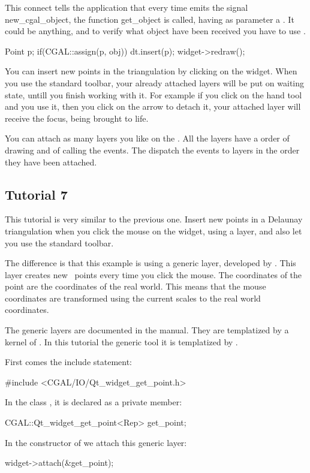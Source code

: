 This connect tells the application that every time
 emits the signal new\_cgal\_object, the function
get\_object is called, having as parameter a . It could be
anything, and to verify what object have been received you have to use
.
\begin{ccExampleCode}
  Point p;
  if(CGAL::assign(p, obj)) {
      dt.insert(p);
      widget->redraw();
  }
\end{ccExampleCode}
You can insert new points in the triangulation by clicking on the
widget. When you use the standard toolbar, your already attached layers
will be put on waiting state, untill you finish working with it. For
example if you click on the hand tool and you use it, then you click
on the arrow to detach it, your attached layer will receive the
focus, being brought to life.

You can attach as many layers you like on the . All
the layers have a order of drawing and of calling the events. The
 dispatch the events to layers in the order they have
been attached.

\subsection*{Tutorial 7}

This tutorial is very similar to the previous one. Insert new points
in a Delaunay triangulation when you click the mouse on the widget,
using a layer, and also let you use the standard toolbar.

The difference is that this example is using a generic layer, developed
by \cgal. This layer creates new \cgal\ points every time you click the
mouse. The coordinates of the point are the coordinates of the real
world. This means that the mouse coordinates are transformed using the
current scales to the real world coordinates.

The generic layers are documented in the manual. They are templatized
by a kernel of \cgal. In this tutorial the generic tool
 it is templatized by
.

First comes the include statement:
\begin{ccExampleCode}
#include <CGAL/IO/Qt_widget_get_point.h>
\end{ccExampleCode}
In the class , it is declared as a private member:
\begin{ccExampleCode}
CGAL::Qt_widget_get_point<Rep> get_point;
\end{ccExampleCode}
In the constructor of  we attach this generic layer:
\begin{ccExampleCode}
widget->attach(&get_point);
\end{ccExampleCode}

